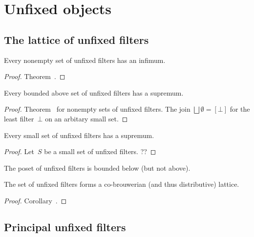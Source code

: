 \chapter{Unfixed objects}

\section{The lattice of unfixed filters}

\begin{thm}
Every nonempty set of unfixed filters has an infimum.
\end{thm}

\begin{proof}
Theorem~.
\end{proof}

\begin{thm}
Every bounded above set of unfixed filters has a supremum.
\end{thm}

\begin{proof}
Theorem~ for nonempty sets of unfixed
filters. The join $\bigsqcup\emptyset=[\bot]$ for the
least filter~$\bot$ on an arbitary small set.
\end{proof}

\begin{cor}
Every small set of unfixed filters has a supremum.
\end{cor}

\begin{proof}
Let~$S$ be a small set of unfixed filters. ??
\end{proof}

\begin{obvious}
The poset of unfixed filters is bounded below (but not above).
\end{obvious}

\begin{prop}
The set of unfixed filters forms a co-brouwerian (and thus
distributive) lattice.
\end{prop}

\begin{proof}
Corollary~.
\end{proof}

\section{Principal unfixed filters}

